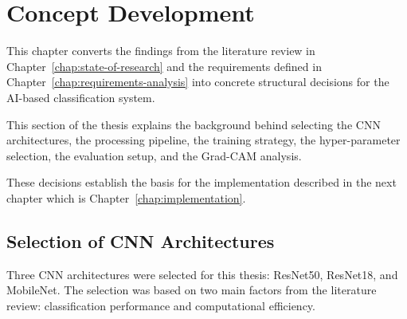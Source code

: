 \chapter{Concept Development}
\label{chap:concept-development}

This chapter converts the findings from the literature review in Chapter~\ref{chap:state-of-research} and the requirements defined in Chapter~\ref{chap:requirements-analysis} into concrete structural decisions for the AI-based classification system.

This section of the thesis explains the background behind selecting the CNN architectures, the processing pipeline, the training strategy, the hyper-parameter selection, the evaluation setup, and the Grad-CAM analysis.

These decisions establish the basis for the implementation described in the next chapter which is Chapter~\ref{chap:implementation}.

\section{Selection of CNN Architectures}

Three CNN architectures were selected for this thesis: ResNet50, ResNet18, and MobileNet. The selection was based on two main factors from the literature review: classification performance and computational efficiency.


